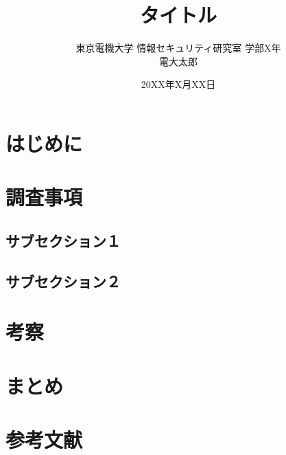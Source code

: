 \documentclass[twocolumn, uplatex]{jarticle}
\title{タイトル}
\date{20XX年X月XX日}
\author{東京電機大学 情報セキュリティ研究室 学部X年\\電大太郎}
\begin{document}
	\maketitle

	\section{はじめに}

	\section{調査事項}

	\subsection{サブセクション１}
	
	\subsection{サブセクション２}
	
	\section{考察}
	
	\section{まとめ}
	
	\section{参考文献}
\end{document}
